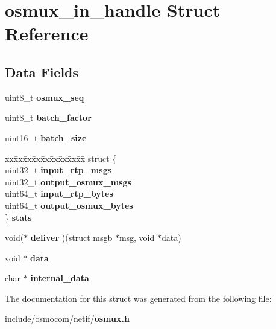\section{osmux\+\_\+in\+\_\+handle Struct Reference}
\label{structosmux__in__handle}
\subsection*{Data Fields}
\begin{DoxyCompactItemize}
\item 
uint8\+\_\+t {\bfseries osmux\+\_\+seq}\label{structosmux__in__handle_a1ba076a41ef9c3413665b7444c6521cc}

\item 
uint8\+\_\+t {\bfseries batch\+\_\+factor}\label{structosmux__in__handle_a19f745e91cf6cde79d37311775e08474}

\item 
uint16\+\_\+t {\bfseries batch\+\_\+size}\label{structosmux__in__handle_a368e53721d8272b6f9d62b398db0402d}

\item 
\begin{tabbing}
xx\=xx\=xx\=xx\=xx\=xx\=xx\=xx\=xx\=\kill
struct \{\\
\>uint32\_t {\bfseries input\_rtp\_msgs}\\
\>uint32\_t {\bfseries output\_osmux\_msgs}\\
\>uint64\_t {\bfseries input\_rtp\_bytes}\\
\>uint64\_t {\bfseries output\_osmux\_bytes}\\
\} {\bfseries stats}\label{structosmux__in__handle_a37f3e33e1cd6b6fbead90d22e38193b2}
\\

\end{tabbing}\item 
void($\ast$ {\bfseries deliver} )(struct msgb $\ast$msg, void $\ast$data)\label{structosmux__in__handle_aef1dba895e5ce6443082e3878c3704c8}

\item 
void $\ast$ {\bfseries data}\label{structosmux__in__handle_a5e956516034fe24c6e52b481d994c8c5}

\item 
char $\ast$ {\bfseries internal\+\_\+data}\label{structosmux__in__handle_a882fe396ba5bf4e9cef37bed4d9ded04}

\end{DoxyCompactItemize}


The documentation for this struct was generated from the following file\+:\begin{DoxyCompactItemize}
\item 
include/osmocom/netif/{\bf osmux.\+h}\end{DoxyCompactItemize}
